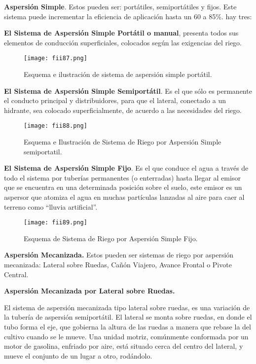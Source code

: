 \textbf{Aspersión Simple}. Estos pueden ser: portátiles, semiportátiles y fijos. Este
sistema puede incrementar la eficiencia de aplicación hasta un 60 a 85\%. hay tres:

\textbf{El Sistema de Aspersión Simple Portátil o manual}, presenta todos sus
elementos de conducción superficiales, colocados según las exigencias del riego.

\begin{figure}[h!]
	\centerline{\texttt{[image: fii87.png]}}
	\caption{Esquema e ilustración de sistema de aspersión simple portátil.}
	\label{fii87}
\end{figure}

\textbf{El Sistema de Aspersión Simple Semiportátil}. Es el que sólo es
permanente el conducto principal y distribuidores, para que el lateral, conectado a un
hidrante, sea colocado superficialmente, de acuerdo a las necesidades del riego.

\begin{figure}[h!]
	\centerline{\texttt{[image: fii88.png]}}
	\caption{Esquema e Ilustración de Sistema de Riego por Aspersión Simple semiportatil.}
	\label{fii88}
\end{figure}

\textbf{El Sistema de Aspersión Simple Fijo}. Es el que conduce el agua a
través de todo el sistema por tuberías permanentes (o enterradas) hasta llegar al emisor
que se encuentra en una determinada posición sobre el suelo, este emisor es un
aspersor que atomiza el agua en muchas partículas lanzadas al aire para caer al
terreno como ``lluvia artificial''.


\begin{figure}[h!]
	\centerline{\texttt{[image: fii89.png]}}
	\caption{Esquema de Sistema de Riego por Aspersión Simple Fijo.}
	\label{fii89}
\end{figure}


\textbf{Aspersión Mecanizada.} Estos pueden ser sistemas de riego por aspersión
mecanizada: Lateral sobre Ruedas, Cañón Viajero, Avance Frontal o Pivote Central.


\textbf{Aspersión Mecanizada por Lateral sobre Ruedas.}

El sistema de aspersión mecanizada tipo lateral sobre ruedas, es una variación
de la tubería de aspersión semiportátil. El lateral se monta sobre ruedas, en donde el
tubo forma el eje, que gobierna la altura de las ruedas a manera que rebase la del
cultivo cuando se le mueve. Una unidad motriz, comúnmente conformada por un motor
de gasolina, enfriado por aire, está situado cerca del centro del lateral, y mueve el
conjunto de un lugar a otro, rodándolo.

